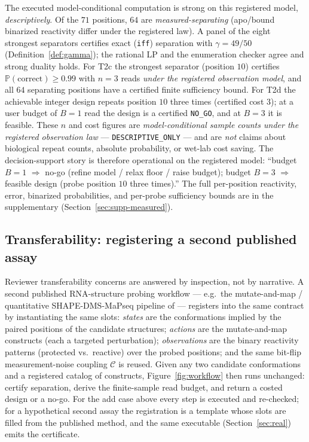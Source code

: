 \documentclass[11pt]{article}
\begin{document}
The executed model-conditional computation is strong on this registered model, \emph{descriptively}. Of
the $71$ positions, $64$ are \emph{measured-separating} (apo/bound binarized reactivity differ under the
registered law). A panel of the eight strongest separators certifies exact (\texttt{iff}) separation
with $\gamma=49/50$ (Definition~\ref{def:gamma}); the rational LP and the enumeration checker agree and
strong duality holds. For T2c the strongest separator (position $10$) certifies
$\mathbb{P}(\mathrm{correct})\ge0.99$ with $n=3$ reads \emph{under the registered observation model},
and all $64$ separating positions have a certified finite sufficiency bound. For T2d the achievable
integer design repeats position $10$ three times (certified cost $3$); at a user budget of $B=1$ read
the design is a certified \texttt{NO\_GO}, and at $B=3$ it is feasible. These $n$ and cost figures are
\emph{model-conditional sample counts under the registered observation law} --- \texttt{DESCRIPTIVE\_ONLY}
--- and are \emph{not} claims about biological repeat counts, absolute probability, or wet-lab cost
saving. The decision-support story is therefore operational on the registered model: ``budget $B=1$
$\Rightarrow$ no-go (refine model / relax floor / raise budget); budget $B=3$ $\Rightarrow$ feasible
design (probe position $10$ three times).'' The full per-position reactivity, error, binarized
probabilities, and per-probe sufficiency bounds are in the supplementary
(Section~\ref{sec:supp-measured}).

\subsection{Transferability: registering a second published assay}\label{sec:real-transfer}
Reviewer transferability concerns are answered by inspection, not by narrative. A second published
RNA-structure probing workflow --- e.g.\ the mutate-and-map / quantitative SHAPE-DMS-MaPseq pipeline of
\citet{kladwang2011mutate,cordero2012importance,cheng2015consistent} --- registers into the same
contract by instantiating the same slots: \emph{states} are the conformations implied by the paired
positions of the candidate structures; \emph{actions} are the mutate-and-map constructs (each a
targeted perturbation); \emph{observations} are the binary reactivity patterns (protected vs.\ reactive)
over the probed positions; and the same bit-flip measurement-noise coupling $\mathcal{C}$ is reused.
Given any two candidate conformations and a registered catalog of constructs, Figure~\ref{fig:workflow}
then runs unchanged: certify separation, derive the finite-sample read budget, and return a costed
design or a no-go. For the add case above every step is executed and re-checked; for a hypothetical
second assay the registration is a template whose slots are filled from the published method, and the
same executable (Section~\ref{sec:real}) emits the certificate.
\end{document}
